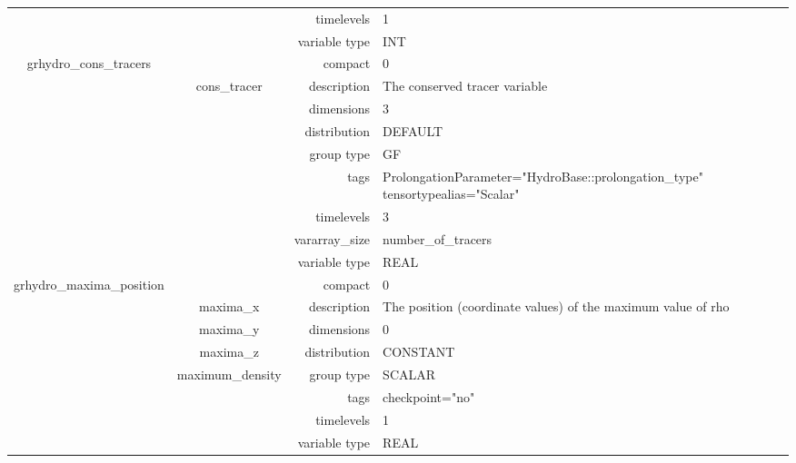 \begin{tabular*}{150mm}{|c|c@{\extracolsep{\fill}}|rl|}
 &  & timelevels & 1 \\ 
 &  & variable type & INT \\ 
\hline 
grhydro\_cons\_tracers &  & compact & 0 \\ 
 & cons\_tracer & description & The conserved tracer variable \\ 
 &  & dimensions & 3 \\ 
 &  & distribution & DEFAULT \\ 
 &  & group type & GF \\ 
 &  & tags & ProlongationParameter="HydroBase::prolongation\_type" tensortypealias="Scalar" \\ 
 &  & timelevels & 3 \\ 
 &  & vararray\_size & number\_of\_tracers \\ 
 &  & variable type & REAL \\ 
\hline 
grhydro\_maxima\_position &  & compact & 0 \\ 
 & maxima\_x & description & The position (coordinate values) of the maximum value of rho \\ 
 & maxima\_y & dimensions & 0 \\ 
 & maxima\_z & distribution & CONSTANT \\ 
 & maximum\_density & group type & SCALAR \\ 
 &  & tags & checkpoint="no" \\ 
 &  & timelevels & 1 \\ 
 &  & variable type & REAL \\ 
\hline 
\end{tabular*} 



\vspace{5mm}
\vspace{5mm}


